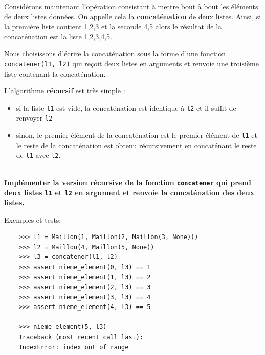 \documentclass[a4paper,17pt]{extarticle}
\newenvironment{eleve}%
{\begin{activite}\color{noiramu}\\[-0.5cm]}
{\end{activite}}
\providecommand{\tightlist}{%
      \setlength{\itemsep}{0pt}\setlength{\parskip}{0pt}}
\begin{document}
    Considérons maintenant l'opération consistant à mettre bout à bout les
éléments de deux listes données. On appelle cela la
\textbf{concaténation} de deux listes. Ainsi, si la première liste
contient 1,2,3 et la seconde 4,5 alors le résultat de la concaténation
est la liste 1,2,3,4,5.

Nous choisissons d'écrire la concaténation sous la forme d'une fonction
\texttt{concatener(l1,\ l2)} qui reçoit deux listes en arguments et
renvoie une troisième liste contenant la concaténation.
\begin{retenir}
    L'algorithme \textbf{récursif} est très simple :

\begin{itemize}
\tightlist
\item
  si la liste \texttt{l1} est vide, la concaténation est identique à
  \texttt{l2} et il suffit de renvoyer \texttt{l2}
\item
  sinon, le premier élément de la concaténation est le premier élément
  de \texttt{l1} et le reste de la concaténation est obtenu
  récursivement en concaténant le reste de \texttt{l1} avec \texttt{l2}.
\end{itemize}

        \end{retenir}\begin{eleve}
    \textbf{Implémenter la version récursive de la fonction
\texttt{concatener} qui prend deux listes \texttt{l1} et \texttt{l2} en
argument et renvoie la concaténation des deux listes.}

Exemples et tests:

\begin{verbatim}
    >>> l1 = Maillon(1, Maillon(2, Maillon(3, None)))
    >>> l2 = Maillon(4, Maillon(5, None))
    >>> l3 = concatener(l1, l2)
    >>> assert nieme_element(0, l3) == 1
    >>> assert nieme_element(1, l3) == 2
    >>> assert nieme_element(2, l3) == 3
    >>> assert nieme_element(3, l3) == 4
    >>> assert nieme_element(4, l3) == 5

    >>> nieme_element(5, l3)
    Traceback (most recent call last):
    IndexError: index out of range
\end{verbatim}
        

\end{eleve}
\end{document}
